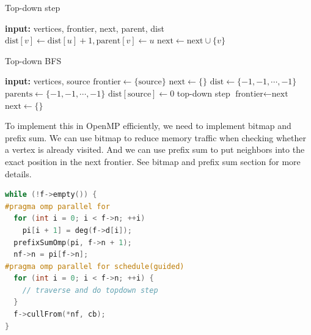 \documentclass[10pt,twocolumn,letterpaper]{article}
\begin{document}
\begin{algorithm}
    \caption{Top-down step} 
	\label{topdownstep}
    \begin{algorithmic}
        \STATE \textbf{input: }vertices, frontier, next, parent, dist
                    \STATE $\text{dist}[v] \gets \text{dist}[u] + 1, \text{parent}[v] \gets u$
                    \STATE $\text{next} \gets \text{next} \cup \{v\}$
                \ENDIF
            \ENDFOR
        \ENDFOR
    \end{algorithmic}
\end{algorithm}

\begin{algorithm}
    \caption{Top-down BFS} 
	\label{topdownstep}
    \begin{algorithmic}
        \STATE \textbf{input: }vertices, source
        \STATE $\text{frontier} \gets \{\text{source}\}$
        \STATE $\text{next} \gets \{\}$
        \STATE $\text{dist} \gets \{-1, -1, \cdots, -1\}$
        \STATE $\text{parents} \gets \{-1, -1, \cdots, -1\}$
        \STATE $\text{dist}[\text{source}] \gets 0$
            \STATE top-down step
            \STATE $\text{frontier} \gets \text{next}$
            \STATE $\text{next} \gets \{\}$
        \ENDWHILE
    \end{algorithmic}
\end{algorithm}

To implement this in OpenMP efficiently, we need to implement bitmap and prefix sum. We can use bitmap to reduce memory traffic when checking whether a vertex is already visited. And we can use prefix sum to put neighbors into the exact position in the next frontier. See bitmap and prefix sum section for more details.\\

\begin{lstlisting}[language=C++]
while (!f->empty()) {
#pragma omp parallel for
  for (int i = 0; i < f->n; ++i)
    pi[i + 1] = deg(f->d[i]);
  prefixSumOmp(pi, f->n + 1);
  nf->n = pi[f->n];
#pragma omp parallel for schedule(guided)
  for (int i = 0; i < f->n; ++i) {
    // traverse and do topdown step
  }
  f->cullFrom(*nf, cb);
}

\end{lstlisting}
\end{document}
